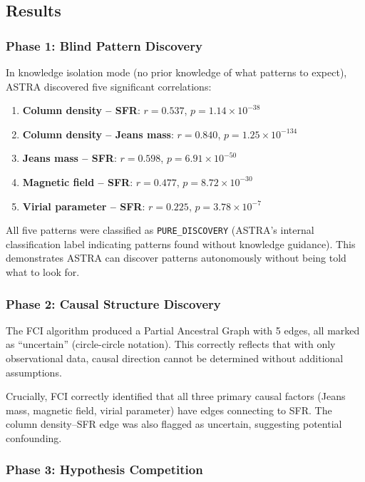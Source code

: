 \documentclass[usenatbib]{rasti}
\begin{document}
\subsection{Results}

\subsubsection{Phase 1: Blind Pattern Discovery}

In knowledge isolation mode (no prior knowledge of what patterns to expect), ASTRA discovered five significant correlations:

\begin{enumerate}
\item \textbf{Column density -- SFR}: $r = 0.537$, $p = 1.14 \times 10^{-38}$
\item \textbf{Column density -- Jeans mass}: $r = 0.840$, $p = 1.25 \times 10^{-134}$
\item \textbf{Jeans mass -- SFR}: $r = 0.598$, $p = 6.91 \times 10^{-50}$
\item \textbf{Magnetic field -- SFR}: $r = 0.477$, $p = 8.72 \times 10^{-30}$
\item \textbf{Virial parameter -- SFR}: $r = 0.225$, $p = 3.78 \times 10^{-7}$
\end{enumerate}

All five patterns were classified as \texttt{PURE\_DISCOVERY} (ASTRA's internal classification label indicating patterns found without knowledge guidance). This demonstrates ASTRA can discover patterns autonomously without being told what to look for.

\subsubsection{Phase 2: Causal Structure Discovery}

The FCI algorithm produced a Partial Ancestral Graph with 5 edges, all marked as ``uncertain'' (circle-circle notation). This correctly reflects that with only observational data, causal direction cannot be determined without additional assumptions.

Crucially, FCI correctly identified that all three primary causal factors (Jeans mass, magnetic field, virial parameter) have edges connecting to SFR. The column density--SFR edge was also flagged as uncertain, suggesting potential confounding.

\subsubsection{Phase 3: Hypothesis Competition}
\end{document}
